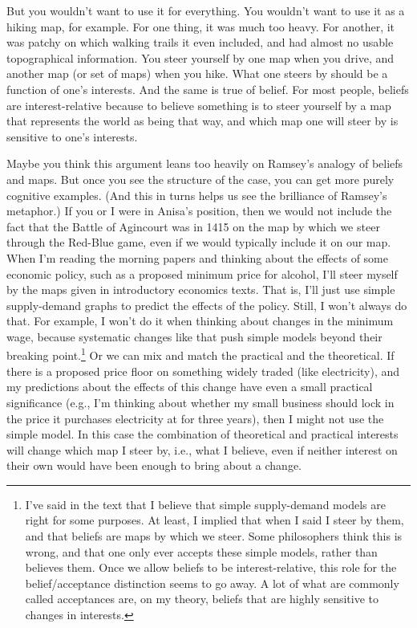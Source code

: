 \documentclass[
  10pt,
  letterpaper,
  twoside]{scrbook}
\begin{document}
But you wouldn't want to use it for everything. You wouldn't want to use
it as a hiking map, for example. For one thing, it was much too heavy.
For another, it was patchy on which walking trails it even included, and
had almost no usable topographical information. You steer yourself by
one map when you drive, and another map (or set of maps) when you hike.
What one steers by should be a function of one's interests. And the same
is true of belief. For most people, beliefs are interest-relative
because to believe something is to steer yourself by a map that
represents the world as being that way, and which map one will steer by
is sensitive to one's interests.

Maybe you think this argument leans too heavily on Ramsey's analogy of
beliefs and maps. But once you see the structure of the case, you can
get more purely cognitive examples. (And this in turns helps us see the
brilliance of Ramsey's metaphor.) If you or I were in Anisa's position,
then we would not include the fact that the Battle of Agincourt was in
1415 on the map by which we steer through the Red-Blue game, even if we
would typically include it on our map. When I'm reading the morning
papers and thinking about the effects of some economic policy, such as a
proposed minimum price for alcohol, I'll steer myself by the maps given
in introductory economics texts. That is, I'll just use simple
supply-demand graphs to predict the effects of the policy. Still, I
won't always do that. For example, I won't do it when thinking about
changes in the minimum wage, because systematic changes like that push
simple models beyond their breaking point.\footnote{I've said in the
  text that I believe that simple supply-demand models are right for
  some purposes. At least, I implied that when I said I steer by them,
  and that beliefs are maps by which we steer. Some philosophers think
  this is wrong, and that one only ever accepts these simple models,
  rather than believes them. Once we allow beliefs to be
  interest-relative, this role for the belief/acceptance distinction
  seems to go away. A lot of what are commonly called acceptances are,
  on my theory, beliefs that are highly sensitive to changes in
  interests.} Or we can mix and match the practical and the theoretical.
If there is a proposed price floor on something widely traded (like
electricity), and my predictions about the effects of this change have
even a small practical significance (e.g., I'm thinking about whether my
small business should lock in the price it purchases electricity at for
three years), then I might not use the simple model. In this case the
combination of theoretical and practical interests will change which map
I steer by, i.e., what I believe, even if neither interest on their own
would have been enough to bring about a change.
\end{document}
